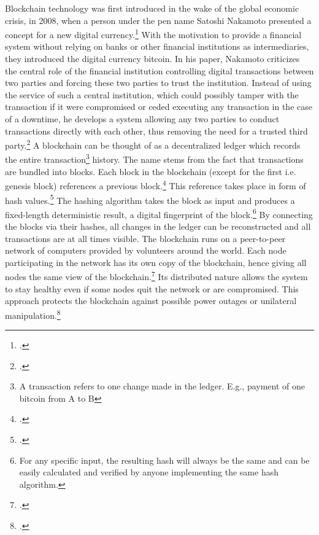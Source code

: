 Blockchain technology was first introduced in the wake of the global economic crisis, in 2008, when a person under the pen name Satoshi Nakamoto presented a concept for a new digital currency.\footcite[Cf.][]{Nakamoto.2008} With the motivation to provide a financial system without relying on banks or other financial institutions as intermediaries, they introduced the digital currency bitcoin. In his paper, Nakamoto criticizes the central role of the financial institution controlling digital transactions between two parties and forcing these two parties to trust the institution. Instead of using the service of such a central institution, which could possibly tamper with the transaction if it were compromised or ceded executing any transaction in the case of a downtime, he develops a system allowing any two parties to conduct transactions directly with each other, thus removing the need for a trusted third party.\footcite[Cf.][p.2]{Nakamoto.2008} A blockchain can be thought of as a decentralized ledger which records the entire transaction\footnote{A transaction refers to one change made in the ledger. E.g., payment of one bitcoin from A to B} history. The name stems from the fact that transactions are bundled into blocks. Each block in the blockchain (except for the first i.e. genesis block) references a previous block.\footcite[Cf.][chapter 1]{BashirMasteringBlockchain2017} This reference takes place in form of hash values.\footcite[Cf.][p.351]{AntonopolousAndreasM..2017} The hashing algorithm takes the block as input and produces a fixed-length deterministic result, a digital fingerprint of the block.\footnote{For any specific input, the resulting hash will always be the same and can be easily calculated and verified by anyone implementing the same hash algorithm.} By connecting the blocks via their hashes, all changes in the ledger can be reconstructed and all transactions are at all times visible. The blockchain runs on a peer-to-peer network of computers provided by volunteers around the world. Each node participating in the network has its own copy of the blockchain, hence giving all nodes the same view of the blockchain.\footcites[Cf.][p.5]{Tapscott.2017}[cf.][p.41]{Welzel.2017} Its distributed nature allows the system to stay healthy even if some nodes quit the network or are compromised. This approach protects the blockchain against possible power outages or unilateral manipulation.\footcite[Cf.][p.8]{Nakamoto.2008}

